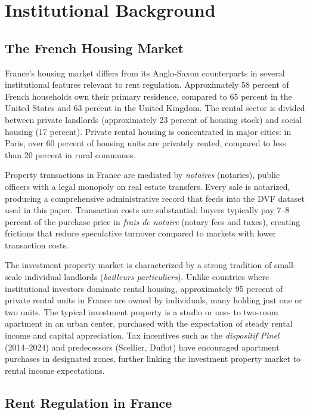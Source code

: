 \documentclass[12pt]{article}
\begin{document}
\section{Institutional Background}

\subsection{The French Housing Market}

France's housing market differs from its Anglo-Saxon counterparts in several institutional features relevant to rent regulation. Approximately 58 percent of French households own their primary residence, compared to 65 percent in the United States and 63 percent in the United Kingdom. The rental sector is divided between private landlords (approximately 23 percent of housing stock) and social housing (17 percent). Private rental housing is concentrated in major cities: in Paris, over 60 percent of housing units are privately rented, compared to less than 20 percent in rural communes.

Property transactions in France are mediated by \emph{notaires} (notaries), public officers with a legal monopoly on real estate transfers. Every sale is notarized, producing a comprehensive administrative record that feeds into the DVF dataset used in this paper. Transaction costs are substantial: buyers typically pay 7--8 percent of the purchase price in \emph{frais de notaire} (notary fees and taxes), creating frictions that reduce speculative turnover compared to markets with lower transaction costs.

The investment property market is characterized by a strong tradition of small-scale individual landlords (\emph{bailleurs particuliers}). Unlike countries where institutional investors dominate rental housing, approximately 95 percent of private rental units in France are owned by individuals, many holding just one or two units. The typical investment property is a studio or one- to two-room apartment in an urban center, purchased with the expectation of steady rental income and capital appreciation. Tax incentives such as the \emph{dispositif Pinel} (2014--2024) and predecessors (Scellier, Duflot) have encouraged apartment purchases in designated zones, further linking the investment property market to rental income expectations.

\subsection{Rent Regulation in France}
\end{document}
